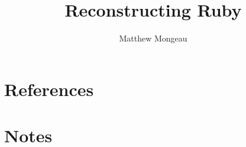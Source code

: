 \documentclass[oneside]{book}
\date{}
\begin{document}

\title{Reconstructing Ruby}
\author{Matthew Mongeau}
\maketitle

\frontmatter
\tableofcontents


\mainmatter




\appendix
\chapter{References}

\backmatter
\chapter{Notes}
\end{document}
